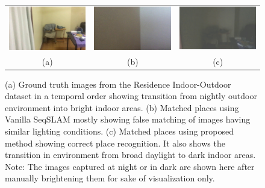 \documentclass[letterpaper, 10 pt, conference]{ieeeconf}  %
\begin{document}
\begin{figure}[htbp]
\begin{tabular}{ccc}
 \includegraphics[width=\imgW,height=\imgH]{rio-q8} &
 \includegraphics[width=\imgW,height=\imgH]{rio-rf8} &
 \includegraphics[width=\imgW,height=\imgH]{rio-r8-2} \\
 
  (a) & (b) & (c) \\
 
\end{tabular}
\caption{(a) Ground truth images from the Residence Indoor-Outdoor dataset in a temporal order showing transition from nightly outdoor environment into bright indoor areas. (b) Matched places using Vanilla SeqSLAM mostly showing false matching of images having similar lighting conditions. (c) Matched places using proposed method showing correct place recognition. It also shows the transition in environment from broad daylight to dark indoor areas. Note: The images captured at night or in dark are shown here after manually brightening them for sake of visualization only.}
\label{fig:rioTransImages}
\end{figure}
\end{document}
